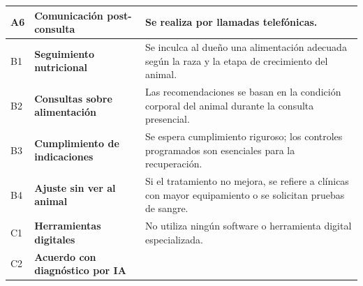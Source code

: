 \documentclass[
]{article}
\newcounter{none} %
\begin{document}
{\def\LTcaptype{none} %
\begin{longtable}[]{@{}
  >{\centering\arraybackslash}p{}
  >{\raggedright\arraybackslash}p{}
  >{\raggedright\arraybackslash}p{}@{}}
\toprule\noalign{}
\begin{minipage}[b]{\linewidth}\centering
A6
\end{minipage} & \begin{minipage}[b]{\linewidth}\raggedright
\textbf{Comunicación post-consulta}
\end{minipage} & \begin{minipage}[b]{\linewidth}\raggedright
Se realiza por llamadas telefónicas.
\end{minipage} \\
\midrule\noalign{}
\endhead
\bottomrule\noalign{}
\endlastfoot
B1 & \textbf{Seguimiento nutricional} &
\begin{minipage}[t]{\linewidth}\raggedright
Se inculca al dueño una alimentación adecuada según la raza y la etapa
de crecimiento del animal.
\end{minipage} \\
B2 & \textbf{Consultas sobre alimentación} &
\begin{minipage}[t]{\linewidth}\raggedright
Las recomendaciones se basan en la condición corporal del animal durante
la consulta presencial.
\end{minipage} \\
B3 & \textbf{Cumplimiento de indicaciones} &
\begin{minipage}[t]{\linewidth}\raggedright
Se espera cumplimiento riguroso; los controles programados son
esenciales para la recuperación.
\end{minipage} \\
B4 & \textbf{Ajuste sin ver al animal} &
\begin{minipage}[t]{\linewidth}\raggedright
Si el tratamiento no mejora, se refiere a clínicas con mayor
equipamiento o se solicitan pruebas de sangre.
\end{minipage} \\
C1 & \textbf{Herramientas digitales} &
\begin{minipage}[t]{\linewidth}\raggedright
No utiliza ningún software o herramienta digital especializada.
\end{minipage} \\
C2 & \textbf{Acuerdo con diagnóstico por IA} &
\begin{minipage}[t]{\linewidth}\raggedright

\end{minipage}
\end{longtable}}
\end{document}
